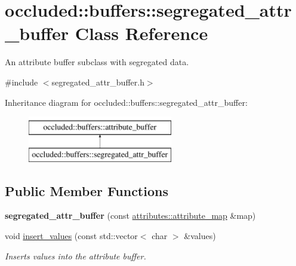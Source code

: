 \hypertarget{classoccluded_1_1buffers_1_1segregated__attr__buffer}{\section{occluded\+:\+:buffers\+:\+:segregated\+\_\+attr\+\_\+buffer Class Reference}
\label{classoccluded_1_1buffers_1_1segregated__attr__buffer}
}


An attribute buffer subclass with segregated data.  




{\ttfamily \#include $<$segregated\+\_\+attr\+\_\+buffer.\+h$>$}

Inheritance diagram for occluded\+:\+:buffers\+:\+:segregated\+\_\+attr\+\_\+buffer\+:\begin{figure}[H]
\begin{center}
\leavevmode
\includegraphics[height=2.000000cm]{classoccluded_1_1buffers_1_1segregated__attr__buffer}
\end{center}
\end{figure}
\subsection*{Public Member Functions}
\begin{DoxyCompactItemize}
\item 
\hypertarget{classoccluded_1_1buffers_1_1segregated__attr__buffer_ab822a9e4ccf2be069418224fc2663622}{{\bfseries segregated\+\_\+attr\+\_\+buffer} (const \hyperlink{classoccluded_1_1buffers_1_1attributes_1_1attribute__map}{attributes\+::attribute\+\_\+map} \&map)}\label{classoccluded_1_1buffers_1_1segregated__attr__buffer_ab822a9e4ccf2be069418224fc2663622}

\item 
void \hyperlink{classoccluded_1_1buffers_1_1segregated__attr__buffer_a437ef88504021dc75d45dff010986128}{insert\+\_\+values} (const std\+::vector$<$ char $>$ \&values)
\begin{DoxyCompactList}\small\item\em Inserts values into the attribute buffer. \end{DoxyCompactList}\end{DoxyCompactItemize}
